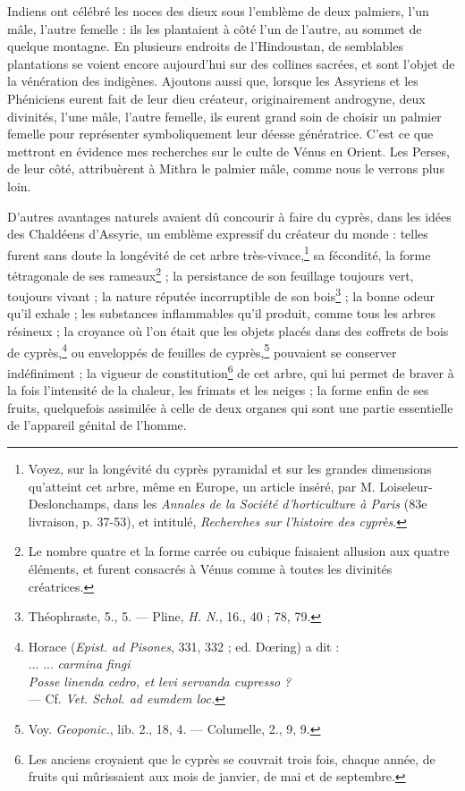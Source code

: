 \documentclass[a4paper, 11pt, oneside, polutonikogreek, french]{article}
\begin{document}
Indiens ont célébré les noces des dieux sous l'emblème de deux palmiers, l'un mâle, l'autre femelle : ils les plantaient à côté l'un de l'autre, au sommet de quelque montagne. En plusieurs endroits de l'Hindoustan, de semblables plantations se voient encore aujourd'hui sur des collines sacrées, et sont l'objet de la vénération des indigènes. Ajoutons aussi que, lorsque les Assyriens et les Phéniciens eurent fait de leur dieu créateur, originairement androgyne, deux divinités, l'une mâle, l'autre femelle, ils eurent grand soin de choisir un palmier femelle pour représenter symboliquement leur déesse génératrice. C'est ce que mettront en évidence mes recherches sur le culte de Vénus en Orient. Les Perses, de leur côté, attribuèrent à Mithra le palmier mâle, comme nous le verrons plus loin.

D'autres avantages naturels avaient dû concourir à faire du cyprès, dans les idées des Chaldéens d'Assyrie, un emblème expressif du créateur du monde : telles furent sans doute la longévité de cet arbre très-vivace,\footnote{Voyez, sur la longévité du cyprès pyramidal et sur les grandes dimensions qu'atteint cet arbre, même en Europe, un article inséré, par M. Loiseleur-Deslonchamps, dans les \emph{Annales de la Société d'horticulture à Paris} (83e livraison, p. 37-53), et intitulé, \emph{Recherches sur l'histoire des cyprès}.} sa fécondité, la forme tétragonale de ses rameaux\footnote{Le nombre quatre et la forme carrée ou cubique faisaient allusion aux quatre éléments, et furent consacrés à Vénus comme à toutes les divinités créatrices.} ; la persistance de son feuillage toujours vert, toujours vivant ; la nature réputée incorruptible de son bois\footnote{Théophraste, 5., 5. --- Pline, \emph{H. N.}, 16., 40 ; 78, 79.} ; la bonne odeur qu'il exhale ; les substances inflammables qu'il produit, comme tous les arbres résineux ; la croyance où l'on était que les objets placés dans des coffrets de bois de cyprès,\footnote{Horace (\emph{Epist. ad Pisones}, 331, 332 ; ed. Dœring) a dit :\\\hspace*{10mm}... ... \emph{carmina fingi}\\\hspace*{10mm}\emph{Posse linenda cedro, et levi servanda cupresso ?}\\\hspace*{5mm}--- Cf. \emph{Vet. Schol. ad eumdem loc.}} ou enveloppés de feuilles de cyprès,\footnote{Voy. \emph{Geoponic.}, lib. 2., 18, 4. --- Columelle, 2., 9, 9.} pouvaient se conserver indéfiniment ; la vigueur de constitution\footnote{Les anciens croyaient que le cyprès se couvrait trois fois, chaque année, de fruits qui mûrissaient aux mois de janvier, de mai et de septembre.} de cet arbre, qui lui permet de braver à la fois l'intensité de la chaleur, les frimats et les neiges ; la forme enfin de ses fruits, quelquefois assimilée à celle de deux organes qui sont une partie essentielle de l'appareil génital de l'homme.
\end{document}
